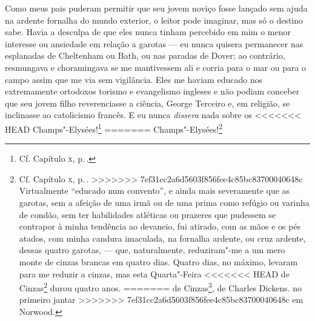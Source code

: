 {{{{{{{{{{{{{{{{{{{{{{{{{{{{{{{{{{{{{{{{{{{{{{{{{{{{{{{{{{{{{{{{{{{{{{{{{{{{{{{{{{{%
Como meus pais puderam permitir que seu jovem noviço fosse lançado
sem ajuda na ardente fornalha do mundo exterior, o leitor pode imaginar,
mas só o destino sabe. Havia a desculpa de que eles nunca tinham
percebido em mim o menor interesse ou ansiedade em relação a garotas ---
eu nunca quisera permanecer nas esplanadas de Cheltenham ou Bath, ou nas
paradas de Dover; ao contrário, resmungava e choramingava se me
mantivessem ali e corria para o mar ou para o campo assim que me via sem
vigilância. Eles me haviam educado nos extremamente ortodoxos torismo e
evangelismo ingleses e não podiam conceber que seu jovem filho
reverenciasse a ciência, George Terceiro e, em religião, se inclinasse
ao catolicismo francês. E eu nunca \textit{dissera} nada sobre os
<<<<<<< HEAD
Champs"-Elysées!\footnote{Cf. Capítulo \textsc{x}, p.\,\pageref{201}.}
=======
Champs"-Elysées!\footnote{Cf. Capítulo \textsc{x}, p.\,\pageref{201}. 
>>>>>>> 7ef31cc2a6d5603f856fee4c85bc83700040648c
Virtualmente ``educado num convento'', e ainda mais severamente que as
garotas, sem a afeição de uma irmã ou de uma prima como refúgio ou
varinha de condão, sem ter habilidades atléticas ou prazeres que
pudessem se contrapor à minha tendência ao devaneio, fui atirado, com as
mãos e os pés atados, com minha candura imaculada, na fornalha ardente,
ou cruz ardente, dessas quatro garotas, --- que, naturalmente,
reduziram"-me a um mero monte de cinzas brancas em quatro dias. Quatro
dias, no máximo, levaram para me reduzir a cinzas, mas esta Quarta"-Feira
<<<<<<< HEAD
de Cinzas\footnote{Em francês, no original: ``Mercredi des cendres''.} durou quatro anos.
=======
de Cinzas\footnote{Em francês, no original: ``Mercredi des cendres''.
   durou quatro anos.
>>>>>>> 7ef31cc2a6d5603f856fee4c85bc83700040648c

Nada mais cômico na aparência, nada mais trágico na essência, poderia
ter sido inventado pelo mais talentoso criador. Em comportamento social
e opinião eu era uma curiosa combinação de Mr.\,Traddles, Mr.\,Toots e Mr.\,Winkle. Tinha a constância e a concentração de Mr.\,Traddles, o gosto pela
conversação de Mr.\,Toots, e a heroica ambição de Mr.\,Winkle; --- todas as
três habilidades iluminadas pela imaginação, como Mr.\,Copperfield,\footnote{Referência ao personagem do romance \textit{David
<<<<<<< HEAD
  Copperfield}, de Charles Dickens.} no primeiro jantar
=======
  Copperfield}, de Charles Dickens.  no primeiro jantar
>>>>>>> 7ef31cc2a6d5603f856fee4c85bc83700040648c
em Norwood.

}}}}}}}}}}}}}}}}}}}}}}}}}}}}}}}}}}}}}}}}}}}}}}}}}}}}}}}}}}}}}}}}}}}}}}}}}}}}}}}}}}}}
